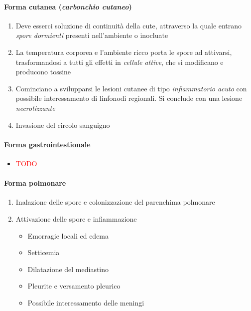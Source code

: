 \documentclass[italian,]{article}
\providecommand{\tightlist}{%
  \setlength{\itemsep}{0pt}\setlength{\parskip}{0pt}}
\newcommand{\asidefigure}[2]{\marginpar{\phantom{Img:}\newline\texttt{[image: \#1]}\\\footnotesize\emph{#2}}}
\newcommand{\TODO}[1]{\textcolor{red}{\textsf{\footnotesize{TODO #1}}}} %
\begin{document}
\hypertarget{forma-cutanea-carbonchio-cutaneo}{%
\paragraph{\texorpdfstring{Forma cutanea (\emph{carbonchio
cutaneo})}{Forma cutanea (carbonchio cutaneo)}}\label{forma-cutanea-carbonchio-cutaneo}}

\begin{enumerate}
\def\labelenumi{\arabic{enumi}.}
\setcounter{enumi}{-1}
\tightlist
\item
  Deve esserci soluzione di continuità della cute, attraverso la quale
  entrano \emph{spore dormienti} presenti nell'ambiente o inocluate
\item
  La temperatura corporea e l'ambiente ricco porta le spore ad
  attivarsi, trasformandosi a tutti gli effetti in \emph{cellule
  attive}, che si modificano e producono tossine
\item
  Cominciano a svilupparsi le lesioni cutanee di tipo
  \emph{infiammatorio acuto}
  con possibile interessamento di linfonodi regionali. Si conclude con
  una lesione \emph{necrotizzante}
\item
  Invasione del circolo sanguigno
\end{enumerate}

\hypertarget{forma-gastrointestionale}{%
\paragraph{Forma gastrointestionale}\label{forma-gastrointestionale}}

\begin{itemize}
\item
  \TODO{}
\end{itemize}

\hypertarget{forma-polmonare}{%
\paragraph{Forma polmonare}\label{forma-polmonare}}

\begin{enumerate}
\def\labelenumi{\arabic{enumi}.}
\setcounter{enumi}{-1}
\tightlist
\item
  Inalazione delle spore e colonizzazione del parenchima polmonare
\item
  Attivazione delle spore e infiammazione
  \asidefigure{img/espansione-mediastinica.png}{Dilatazione mediastinica}

  \begin{itemize}
  \tightlist
  \item
    Emorragie locali ed edema
  \item
    Setticemia
  \item
    Dilatazione del mediastino
  \item
    Pleurite e versamento pleurico
  \item
    Possibile interessamento delle meningi
  \end{itemize}
\end{enumerate}
\end{document}
